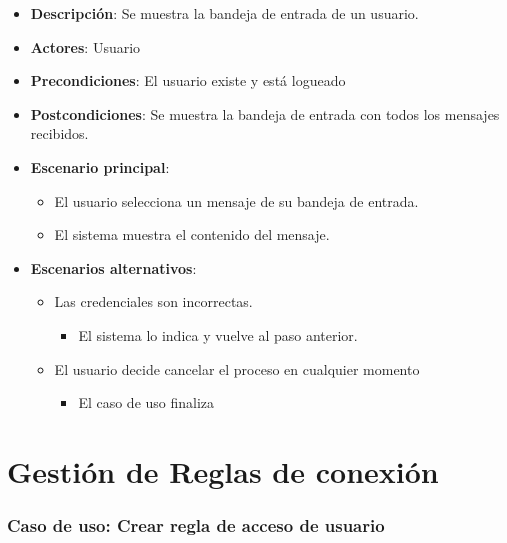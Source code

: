 \documentclass[12pt,a4paperpaper,]{report}
\providecommand{\tightlist}{%
  \setlength{\itemsep}{0pt}\setlength{\parskip}{0pt}}
\begin{document}
\begin{itemize}
\tightlist
\item
  \textbf{Descripción}: Se muestra la bandeja de entrada de un usuario.
\item
  \textbf{Actores}: Usuario
\item
  \textbf{Precondiciones}: El usuario existe y está logueado
\item
  \textbf{Postcondiciones}: Se muestra la bandeja de entrada con todos
  los mensajes recibidos.
\item
  \textbf{Escenario principal}:

  \begin{itemize}
  \tightlist
  \item
    El usuario selecciona un mensaje de su bandeja de entrada.
  \item
    El sistema muestra el contenido del mensaje.
  \end{itemize}
\item
  \textbf{Escenarios alternativos}:

  \begin{itemize}
  \tightlist
  \item
    Las credenciales son incorrectas.

    \begin{itemize}
    \tightlist
    \item
      El sistema lo indica y vuelve al paso anterior.
    \end{itemize}
  \item
    El usuario decide cancelar el proceso en cualquier momento

    \begin{itemize}
    \tightlist
    \item
      El caso de uso finaliza
    \end{itemize}
  \end{itemize}
\end{itemize}

\section{Gestión de Reglas de
conexión}\label{gestiuxf3n-de-reglas-de-conexiuxf3n}

\subsubsection{Caso de uso: Crear regla de acceso de
usuario}\label{caso-de-uso-crear-regla-de-acceso-de-usuario}
\end{document}
